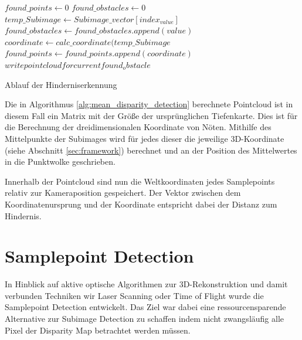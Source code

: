 \begin{algorithm}[h]
\label{alg:mean_disparity_detection}
\begin{algorithmic}[1]
		\State $found\_points \gets 0$
		\State $found\_obstacles \gets 0$
				\State $temp\_Subimage \gets Subimage\_vector[index_{value}]$
				\State $found\_obstacles \gets found\_obstacles.append(value)$
				\State $coordinate \gets calc\_coordinate(temp\_Subimage$
				\State $found\_points \gets found\_points.append(coordinate)$
			\EndIf
		\EndFor
			\State $write pointcloud for current found_obstacle$
		\EndIf 
    \EndProcedure
\end{algorithmic}
\caption{Ablauf der Hinderniserkennung}
\end{algorithm}

\noindent
Die in Algorithmus \ref{alg:mean_disparity_detection} berechnete Pointcloud ist in diesem Fall ein Matrix mit der Größe der ursprünglichen Tiefenkarte. Dies ist für die Berechnung der dreidimensionalen Koordinate von Nöten. Mithilfe des Mittelpunkte der Subimages wird für jedes dieser die jeweilige 3D-Koordinate (siehe Abschnitt \ref{sec:framework}) berechnet und an der Position des Mittelwertes in die Punktwolke geschrieben.

\noindent
Innerhalb der Pointcloud sind nun die Weltkoordinaten jedes Samplepoints relativ zur Kameraposition gespeichert. Der Vektor zwischen dem Koordinatenursprung und der Koordinate entspricht dabei der Distanz zum Hindernis.

\section{Samplepoint Detection}
\label{sec:samplepoint_detection}
In Hinblick auf aktive optische Algorithmen zur 3D-Rekonstruktion und damit verbunden Techniken wir Laser Scanning oder Time of Flight wurde die Samplepoint Detection entwickelt. Das Ziel war dabei eine ressourcensparende Alternative zur Subimage Detection zu schaffen indem nicht zwangsläufig alle Pixel der Disparity Map betrachtet werden müssen.\\


